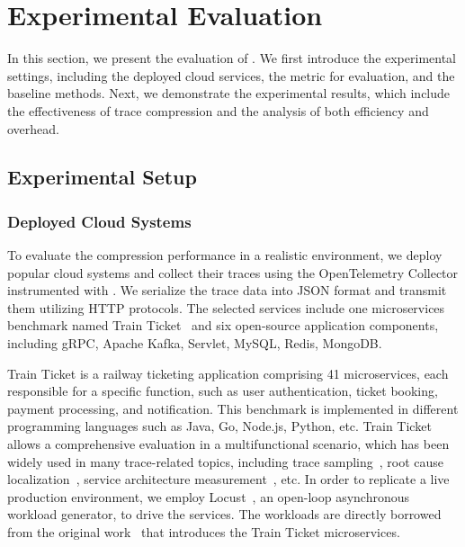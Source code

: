 \section{Experimental Evaluation}
\label{sec:exp_eval}

In this section, we present the evaluation of \alias.
We first introduce the experimental settings, including the deployed cloud services, the metric for evaluation, and the baseline methods.
Next, we demonstrate the experimental results, which include the effectiveness of trace compression and the analysis of both efficiency and overhead.


\subsection{Experimental Setup}

\subsubsection{Deployed Cloud Systems}
\label{sec:deployed_cloud_systems}

To evaluate the compression performance in a realistic environment, we deploy popular cloud systems and collect their traces using the OpenTelemetry Collector instrumented with \alias.
We serialize the trace data into JSON format and transmit them utilizing HTTP protocols.
The selected services include one microservices benchmark named Train Ticket~\cite{DBLP:journals/tse/ZhouPXSJLD21} and six open-source application components, including gRPC, Apache Kafka, Servlet, MySQL, Redis, MongoDB.

Train Ticket is a railway ticketing application comprising 41 microservices, each responsible for a specific function, such as user authentication, ticket booking, payment processing, and notification.
This benchmark is implemented in different programming languages such as Java, Go, Node.js, Python, etc.
Train Ticket allows a comprehensive evaluation in a multifunctional scenario, which has been widely used in many trace-related topics, including trace sampling~\cite{DBLP:conf/IEEEcloud/ChenJSLZ24}, root cause localization~\cite{DBLP:journals/tse/ZhouPXSJLD21,DBLP:conf/issre/ZhouZPYLLZZD23}, service architecture measurement~\cite{DBLP:conf/sigsoft/0001ZZIGC22}, etc.
In order to replicate a live production environment, we employ Locust~\cite{locust}, an open-loop asynchronous workload generator, to drive the services.
The workloads are directly borrowed from the original work~\cite{DBLP:journals/tse/ZhouPXSJLD21} that introduces the Train Ticket microservices. 

